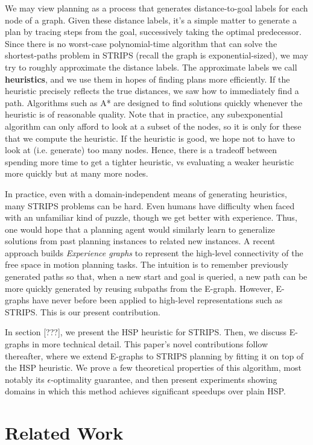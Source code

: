 \documentclass[letterpaper]{article}
\begin{document}
We may view planning as a process that generates distance-to-goal labels for each node of a graph.
Given these distance labels, it's a simple matter to generate a plan by tracing steps from the goal, successively taking the optimal predecessor.
Since there is no worst-case polynomial-time algorithm that can solve the shortest-paths problem in STRIPS (recall the graph is exponential-sized), we may try to roughly approximate the distance labels.
The approximate labels we call \textbf{heuristics}, and we use them in hopes of finding plans more efficiently.
If the heuristic precisely reflects the true distances, we saw how to immediately find a path.
Algorithms such as A* are designed to find solutions quickly whenever the heuristic is of reasonable quality.
Note that in practice, any subexponential algorithm can only afford to look at a subset of the nodes, so it is only for these that we compute the heuristic.
If the heuristic is good, we hope not to have to look at (i.e. generate) too many nodes.
Hence, there is a tradeoff between spending more time to get a tighter heuristic, vs evaluating a weaker heuristic more quickly but at many more nodes.

In practice, even with a domain-independent means of generating heuristics, many STRIPS problems can be hard.
Even humans have difficulty when faced with an unfamiliar kind of puzzle, though we get better with experience.
Thus, one would hope that a planning agent would similarly learn to generalize solutions from past planning instances to related new instances.
A recent approach builds \textit{Experience graphs} to represent the high-level connectivity of the free space in motion planning tasks.
The intuition is to remember previously generated paths so that, when a new start and goal is queried, a new path can be more quickly generated by reusing subpaths from the E-graph.
However, E-graphs have never before been applied to high-level representations such as STRIPS. This is our present contribution.

In section [???], we present the HSP heuristic for STRIPS.
Then, we discuss E-graphs in more technical detail.
This paper's novel contributions follow thereafter, where we extend E-graphs to STRIPS planning by fitting it on top of the HSP heuristic.
We prove a few theoretical properties of this algorithm, most notably its $\epsilon$-optimality guarantee, and then present experiments showing domains in which this method achieves significant speedups over plain HSP.

\section{Related Work}
\end{document}
